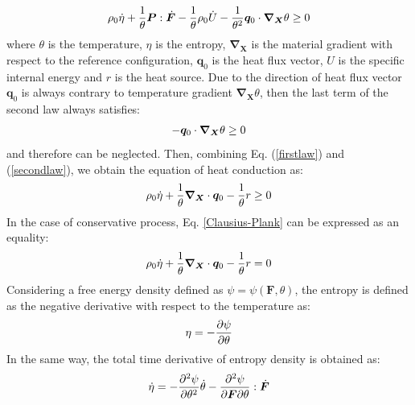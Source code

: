 \documentclass[oneside,11pt,times]{book}
\begin{document}
\begin{equation}
\begin{aligned}
\centering
\rho_0 \dot{\eta}+\frac{1}{\theta}\bm{P}:\dot{\bm{F}}-\frac{1}{\theta}\rho_0 \dot{U}-\frac{1}{\theta^2}\bm{q}_0\cdot\bm{\nabla_{X}}\theta\geq 0
\end{aligned}
\label{secondlaw}
\end{equation}
where $\theta$ is the temperature, $\eta$ is the entropy, $\bm{\nabla_{X}}$ is the material gradient with respect to the reference configuration, $\bm{q}_0$ is the heat flux vector, $U$ is the specific internal energy and $r$ is the heat source.
Due to the direction of heat flux vector $\bm{q}_0$ is always contrary to temperature gradient $\bm{\nabla_{X}}\theta$, then the last term of the second law always satisfies:
\begin{equation}
\begin{aligned}
\centering
-\bm{q}_0\cdot\bm{\nabla_{X}}\theta\geq 0
\end{aligned}
\label{heatconductioninequality}
\end{equation}
and therefore can be neglected. Then, combining Eq. (\ref{firstlaw}) and (\ref{secondlaw}), we obtain the equation of heat conduction as:
\begin{equation}
\begin{aligned}
\centering
\rho_0 \dot{\eta}+\frac{1}{\theta}\bm{\nabla_{X}}\cdot\bm{q}_0-\frac{1}{\theta}r\geq 0
\end{aligned}
\label{Clausius-Plank}
\end{equation}
In the case of conservative process, Eq. \eqref{Clausius-Plank} can be expressed as an equality:
\begin{equation}
\begin{aligned}
\centering
\rho_0 \dot{\eta}+\frac{1}{\theta}\bm{\nabla_{X}}\cdot\bm{q}_0-\frac{1}{\theta}r=0
\end{aligned}
\label{Conservative}
\end{equation}
Considering a free energy density defined as $\psi=\psi(\bm{F},\theta)$, the entropy is defined as the negative derivative with respect to the temperature as:
\begin{equation}
\begin{aligned}
\centering
\eta=-\frac{\partial\psi}{\partial \theta}
\end{aligned}
\label{entropy}
\end{equation}
In the same way, the total time derivative of entropy density is obtained as:
\begin{equation}
\begin{aligned}
\centering
\dot{\eta}=-\frac{\partial^2\psi}{\partial \theta^2}\dot{\theta}-\frac{\partial^2\psi}{\partial \bm{F}\partial \theta}:\dot{\bm{F}}
\end{aligned}
\label{entropy rate}
\end{equation}
\end{document}
